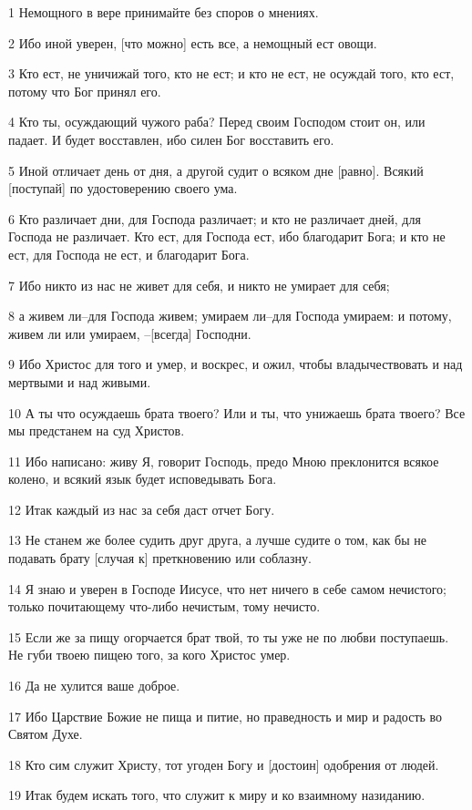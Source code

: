 \par 1 Немощного в вере принимайте без споров о мнениях.
\par 2 Ибо иной уверен, [что можно] есть все, а немощный ест овощи.
\par 3 Кто ест, не уничижай того, кто не ест; и кто не ест, не осуждай того, кто ест, потому что Бог принял его.
\par 4 Кто ты, осуждающий чужого раба? Перед своим Господом стоит он, или падает. И будет восставлен, ибо силен Бог восставить его.
\par 5 Иной отличает день от дня, а другой судит о всяком дне [равно]. Всякий [поступай] по удостоверению своего ума.
\par 6 Кто различает дни, для Господа различает; и кто не различает дней, для Господа не различает. Кто ест, для Господа ест, ибо благодарит Бога; и кто не ест, для Господа не ест, и благодарит Бога.
\par 7 Ибо никто из нас не живет для себя, и никто не умирает для себя;
\par 8 а живем ли--для Господа живем; умираем ли--для Господа умираем: и потому, живем ли или умираем, --[всегда] Господни.
\par 9 Ибо Христос для того и умер, и воскрес, и ожил, чтобы владычествовать и над мертвыми и над живыми.
\par 10 А ты что осуждаешь брата твоего? Или и ты, что унижаешь брата твоего? Все мы предстанем на суд Христов.
\par 11 Ибо написано: живу Я, говорит Господь, предо Мною преклонится всякое колено, и всякий язык будет исповедывать Бога.
\par 12 Итак каждый из нас за себя даст отчет Богу.
\par 13 Не станем же более судить друг друга, а лучше судите о том, как бы не подавать брату [случая к] преткновению или соблазну.
\par 14 Я знаю и уверен в Господе Иисусе, что нет ничего в себе самом нечистого; только почитающему что-либо нечистым, тому нечисто.
\par 15 Если же за пищу огорчается брат твой, то ты уже не по любви поступаешь. Не губи твоею пищею того, за кого Христос умер.
\par 16 Да не хулится ваше доброе.
\par 17 Ибо Царствие Божие не пища и питие, но праведность и мир и радость во Святом Духе.
\par 18 Кто сим служит Христу, тот угоден Богу и [достоин] одобрения от людей.
\par 19 Итак будем искать того, что служит к миру и ко взаимному назиданию.
